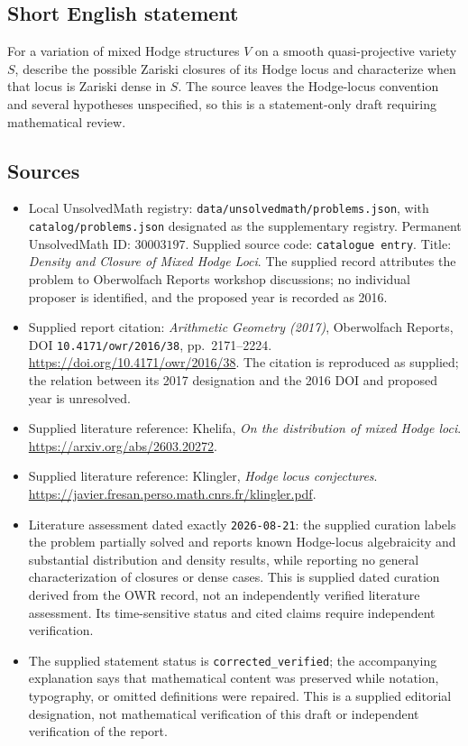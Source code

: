 \documentclass[11pt]{article}
\begin{document}
\subsection{Short English statement}
For a variation of mixed Hodge structures \(V\) on a smooth quasi-projective variety \(S\), describe the possible Zariski closures of its Hodge locus and characterize when that locus is Zariski dense in \(S\). The source leaves the Hodge-locus convention and several hypotheses unspecified, so this is a statement-only draft requiring mathematical review.
\subsection{Sources}
\begin{itemize}
\item Local UnsolvedMath registry: \texttt{data/unsolvedmath/problems.json}, with \texttt{catalog/problems.json} designated as the supplementary registry. Permanent UnsolvedMath ID: \(30003197\). Supplied source code: \texttt{catalogue entry}. Title: \emph{Density and Closure of Mixed Hodge Loci}. The supplied record attributes the problem to Oberwolfach Reports workshop discussions; no individual proposer is identified, and the proposed year is recorded as 2016.
\item Supplied report citation: \emph{Arithmetic Geometry (2017)}, Oberwolfach Reports, DOI \texttt{10.4171/owr/2016/38}, pp.\ 2171--2224. \url{https://doi.org/10.4171/owr/2016/38}. The citation is reproduced as supplied; the relation between its 2017 designation and the 2016 DOI and proposed year is unresolved.
\item Supplied literature reference: Khelifa, \emph{On the distribution of mixed Hodge loci}. \url{https://arxiv.org/abs/2603.20272}.
\item Supplied literature reference: Klingler, \emph{Hodge locus conjectures}. \url{https://javier.fresan.perso.math.cnrs.fr/klingler.pdf}.
\item Literature assessment dated exactly \texttt{2026-08-21}: the supplied curation labels the problem partially solved and reports known Hodge-locus algebraicity and substantial distribution and density results, while reporting no general characterization of closures or dense cases. This is supplied dated curation derived from the OWR record, not an independently verified literature assessment. Its time-sensitive status and cited claims require independent verification.
\item The supplied statement status is \texttt{corrected\_verified}; the accompanying explanation says that mathematical content was preserved while notation, typography, or omitted definitions were repaired. This is a supplied editorial designation, not mathematical verification of this draft or independent verification of the report.
\end{itemize}
\end{document}
